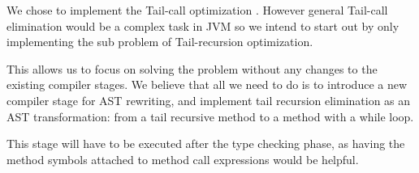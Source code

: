 We chose to implement the Tail-call optimization \cite{Lab7}. However general Tail-call elimination would be a complex task in JVM so we intend to start out by only implementing the sub problem of Tail-recursion optimization. \cite{WinNT}

This allows us to focus on solving the problem without any changes to the existing compiler stages. We believe that all we need to do is to introduce a new compiler stage for AST rewriting, and implement tail recursion elimination as an AST transformation: from a tail recursive method to a method with a while loop.

This stage will have to be executed after the type checking phase, as having the method symbols attached to method call expressions would be helpful.
